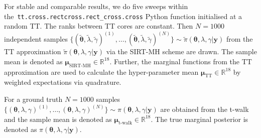 For stable and comparable results, we do five sweeps within \linebreak the~\texttt{tt.cross.rectcross.rect\_cross.cross} Python function initialised at a random TT.
The ranks between TT cores are constant.
Then $N = 1000$ independent samples  $ \{( \tilde{ \bm{\theta}},  \tilde{\lambda},  \tilde{\gamma })^{(1)} ,\dots, (\tilde{ \bm{\theta}},  \tilde{\lambda},  \tilde{\gamma })^{(N)}   \} \sim \tilde{\pi}( \bm{\theta},\lambda,\gamma  | \bm{y})$ from the TT approximation $\tilde{\pi}( \bm{\theta},\lambda,\gamma  | \bm{y})$ via the SIRT-MH scheme are drawn.
The sample mean is denoted as $\bm{\mu}_{\text{SIRT-MH}}\in \mathbb{R}^{18}$.
Further, the marginal functions from the TT approximation are used to calculate the hyper-parameter mean $\bm{\mu}_{\text{TT}}\in \mathbb{R}^{18}$ by weighted expectations via quadrature.

For a ground truth $N = 1000$ samples $ \{( \bm{\theta},\lambda,\gamma )^{(1)} ,\dots,( \bm{\theta},\lambda,\gamma )^{(N)}   \} \sim \pi( \bm{\theta},\lambda,\gamma  | \bm{y})$
are obtained from the t-walk and the sample mean is denoted as $ \bm{\mu}_{\text{t-walk}}  \in \mathbb{R}^{18}$.
The true marginal posterior is denoted as $ \pi( \bm{\theta},\lambda,\gamma  | \bm{y})$.


